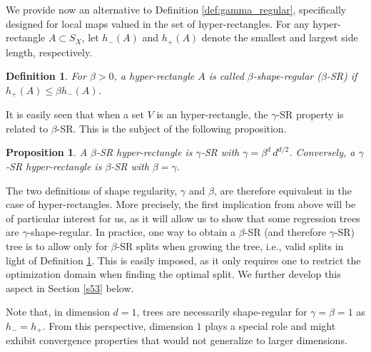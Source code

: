 \documentclass[paper=a4, fontsize=11pt]{scrartcl}
\newtheorem{definition}[theorem]{Definition}
\newtheorem{proposition}[theorem]{Proposition}
\begin{document}
We provide now an alternative to Definition \ref{def:gamma_regular}, specifically designed for local maps valued in the set of hyper-rectangles. %
For any hyper-rectangle $A\subset  S_X$, let $h_-(A)$ and $h_+(A)$ denote the smallest and largest side length, respectively.
\begin{definition}\label{def:beta_regular}
For $\beta>0 $, a hyper-rectangle $ A$ is called $\beta$-shape-regular ($\beta$-SR) if 
$ h_+ (A)  \leq \beta h_-(A)$.
\end{definition}
\noindent It is easily seen that when a set $V$ is an hyper-rectangle, the $\gamma$-SR property is related to $\beta$-SR. This is the subject of the following proposition. 
\begin{proposition}\label{link_beta_gamma}
     A $\beta$-SR hyper-rectangle  is $\gamma$-SR with $\gamma = \beta^d \, d^{d/2}$. Conversely, a $\gamma$-SR hyper-rectangle  is $\beta$-SR with $\beta= \gamma$.
\end{proposition}
\noindent The two definitions of shape regularity, $\gamma$ and $\beta$, are therefore equivalent in the case of hyper-rectangles. More precisely, the first implication from above will be of particular interest for us, as it will allow us to show that some regression trees are $\gamma$-shape-regular. In practice, one way to obtain a $\beta$-SR (and therefore $\gamma$-SR) tree is to allow only for $\beta$-SR splits when growing the tree, i.e., valid splits in light of Definition \ref{def:beta_regular}. This is easily imposed, as it only requires one to restrict the  optimization domain when finding the optimal split. We further develop this aspect in Section \ref{s53} below.


Note that, in dimension $d=1$, trees are necessarily shape-regular for $\gamma=\beta=1$ as $ h_- = h_+$. From this perspective, dimension $1$ plays a special role and might exhibit convergence properties that would not generalize to larger dimensions.
\end{document}

